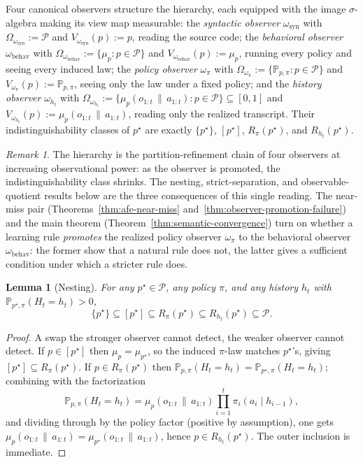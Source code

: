 \documentclass[11pt]{article}
\newtheorem{lemma}[theorem]{Lemma}
\theoremstyle{definition}
\theoremstyle{remark}
\newtheorem{remark}[theorem]{Remark}
\newcommand{\Pcal}{\mathcal{P}}
\newcommand{\Prob}{\mathbb{P}}
\newcommand{\givena}{\,\|\,}
\begin{document}
Four canonical observers structure the hierarchy, each equipped with the image $\sigma$-algebra making its view map measurable: the \emph{syntactic observer} $\omega_{\mathrm{syn}}$ with $\Omega_{\omega_{\mathrm{syn}}}:=\Pcal$ and $V_{\omega_{\mathrm{syn}}}(p):=p$, reading the source code; the \emph{behavioral observer} $\omega_{\mathrm{behav}}$ with $\Omega_{\omega_{\mathrm{behav}}}:=\{\mu_p:p\in\Pcal\}$ and $V_{\omega_{\mathrm{behav}}}(p):=\mu_p$, running every policy and seeing every induced law; the \emph{policy observer} $\omega_\pi$ with $\Omega_{\omega_\pi}:=\{\Prob_{p,\pi}:p\in\Pcal\}$ and $V_{\omega_\pi}(p):=\Prob_{p,\pi}$, seeing only the law under a fixed policy; and the \emph{history observer} $\omega_{h_t}$ with $\Omega_{\omega_{h_t}}:=\{\mu_p(o_{1:t}\givena a_{1:t}):p\in\Pcal\}\subseteq[0,1]$ and $V_{\omega_{h_t}}(p):=\mu_p(o_{1:t}\givena a_{1:t})$, reading only the realized transcript. Their indistinguishability classes of $p^\star$ are exactly $\{p^\star\}$, $[p^\star]$, $R_\pi(p^\star)$, and $R_{h_t}(p^\star)$.

\begin{remark}
\label{rem:four-observers}
The hierarchy is the partition-refinement chain of four observers at increasing observational power: as the observer is promoted, the indistinguishability class shrinks. The nesting, strict-separation, and observable-quotient results below are the three consequences of this single reading. The near-miss pair (Theorems~\ref{thm:afe-near-miss} and~\ref{thm:observer-promotion-failure}) and the main theorem (Theorem~\ref{thm:semantic-convergence}) turn on whether a learning rule \emph{promotes} the realized policy observer $\omega_\pi$ to the behavioral observer $\omega_{\mathrm{behav}}$: the former show that a natural rule does not, the latter gives a sufficient condition under which a stricter rule does.
\end{remark}

\begin{lemma}[Nesting]
\label{lem:nesting}
For any $p^\star\in\Pcal$, any policy $\pi$, and any history $h_t$ with $\Prob_{p^\star,\pi}(H_t=h_t)>0$,
\[
\{p^\star\}\subseteq [p^\star]\subseteq R_\pi(p^\star)\subseteq R_{h_t}(p^\star)\subseteq \Pcal.
\]
\end{lemma}

\begin{proof}
A swap the stronger observer cannot detect, the weaker observer cannot detect. If $p\in[p^\star]$ then $\mu_p=\mu_{p^\star}$, so the induced $\pi$-law matches $p^\star$'s, giving $[p^\star]\subseteq R_\pi(p^\star)$. If $p\in R_\pi(p^\star)$ then $\Prob_{p,\pi}(H_t=h_t)=\Prob_{p^\star,\pi}(H_t=h_t)$; combining with the factorization
\[
\Prob_{p,\pi}(H_t=h_t)=\mu_p(o_{1:t}\givena a_{1:t})\prod_{i=1}^t \pi_i(a_i\mid h_{i-1}),
\]
and dividing through by the policy factor (positive by assumption), one gets $\mu_p(o_{1:t}\givena a_{1:t})=\mu_{p^\star}(o_{1:t}\givena a_{1:t})$, hence $p\in R_{h_t}(p^\star)$. The outer inclusion is immediate.
\end{proof}
\end{document}
